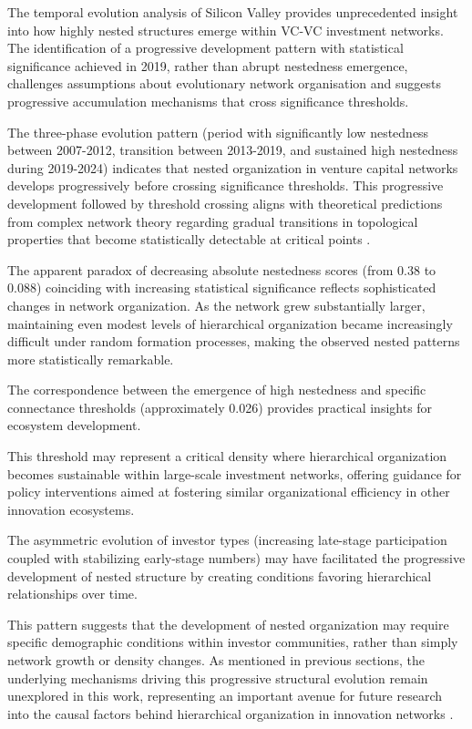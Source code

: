 The temporal evolution analysis of Silicon Valley provides unprecedented insight into how highly nested structures emerge within VC-VC investment networks. The identification of a progressive development pattern with statistical significance achieved in 2019, rather than abrupt nestedness emergence, challenges assumptions about evolutionary network organisation and suggests progressive accumulation mechanisms that cross significance thresholds.

The three-phase evolution pattern (period with significantly low nestedness between 2007-2012, transition between 2013-2019, and sustained high nestedness during 2019-2024) indicates that nested organization in venture capital networks develops progressively before crossing significance thresholds. This progressive development followed by threshold crossing aligns with theoretical predictions from complex network theory regarding gradual transitions in topological properties that become statistically detectable at critical points \cite{Mariani2019}.

The apparent paradox of decreasing absolute nestedness scores (from 0.38 to 0.088) coinciding with increasing statistical significance reflects sophisticated changes in network organization. As the network grew substantially larger, maintaining even modest levels of hierarchical organization became increasingly difficult under random formation processes, making the observed nested patterns more statistically remarkable. 

The correspondence between the emergence of high nestedness and specific connectance thresholds (approximately 0.026) provides practical insights for ecosystem development. 

This threshold may represent a critical density where hierarchical organization becomes sustainable within large-scale investment networks, offering guidance for policy interventions aimed at fostering similar organizational efficiency in other innovation ecosystems.

The asymmetric evolution of investor types (increasing late-stage participation coupled with stabilizing early-stage numbers) may have facilitated the progressive development of nested structure by creating conditions favoring hierarchical relationships over time. 

This pattern suggests that the development of nested organization may require specific demographic conditions within investor communities, rather than simply network growth or density changes. As mentioned in previous sections, the underlying mechanisms driving this progressive structural evolution remain unexplored in this work, representing an important avenue for future research into the causal factors behind hierarchical organization in innovation networks \cite{Mariani2019, Hochberg2007, Uzzi1997}.

